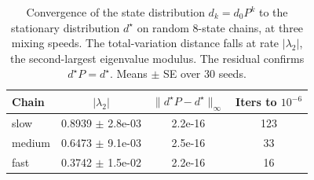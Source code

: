 \begin{table}[h]
\centering
\caption{Convergence of the state distribution $d_k = d_0 P^k$ to the stationary distribution $d^\star$ on random 8-state chains, at three mixing speeds. The total-variation distance falls at rate $|\lambda_2|$, the second-largest eigenvalue modulus. The residual confirms $d^\star P = d^\star$. Means $\pm$ SE over 30 seeds.}
\label{tab:prelim_markov}
\begin{tabular}{lccc}
\hline
Chain & $|\lambda_2|$ & $\|d^\star P - d^\star\|_\infty$ & Iters to $10^{-6}$ \\
\hline
slow & 0.8939 $\pm$ 2.8e-03 & 2.2e-16 & 123 \\
medium & 0.6473 $\pm$ 9.1e-03 & 2.5e-16 & 33 \\
fast & 0.3742 $\pm$ 1.5e-02 & 2.2e-16 & 16 \\
\hline
\end{tabular}
\end{table}
